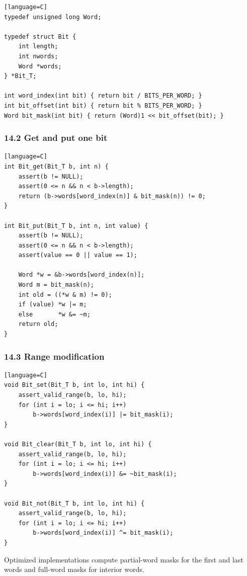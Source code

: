 \documentclass[11pt]{article}
\begin{document}
\begin{verbatim}[language=C]
typedef unsigned long Word;

typedef struct Bit {
    int length;
    int nwords;
    Word *words;
} *Bit_T;

int word_index(int bit) { return bit / BITS_PER_WORD; }
int bit_offset(int bit) { return bit % BITS_PER_WORD; }
Word bit_mask(int bit) { return (Word)1 << bit_offset(bit); }
\end{verbatim}

\subsubsection{14.2 Get and put one bit}\label{get-and-put-one-bit}

\begin{verbatim}[language=C]
int Bit_get(Bit_T b, int n) {
    assert(b != NULL);
    assert(0 <= n && n < b->length);
    return (b->words[word_index(n)] & bit_mask(n)) != 0;
}

int Bit_put(Bit_T b, int n, int value) {
    assert(b != NULL);
    assert(0 <= n && n < b->length);
    assert(value == 0 || value == 1);

    Word *w = &b->words[word_index(n)];
    Word m = bit_mask(n);
    int old = ((*w & m) != 0);
    if (value) *w |= m;
    else       *w &= ~m;
    return old;
}
\end{verbatim}

\subsubsection{14.3 Range modification}\label{range-modification}

\begin{verbatim}[language=C]
void Bit_set(Bit_T b, int lo, int hi) {
    assert_valid_range(b, lo, hi);
    for (int i = lo; i <= hi; i++)
        b->words[word_index(i)] |= bit_mask(i);
}

void Bit_clear(Bit_T b, int lo, int hi) {
    assert_valid_range(b, lo, hi);
    for (int i = lo; i <= hi; i++)
        b->words[word_index(i)] &= ~bit_mask(i);
}

void Bit_not(Bit_T b, int lo, int hi) {
    assert_valid_range(b, lo, hi);
    for (int i = lo; i <= hi; i++)
        b->words[word_index(i)] ^= bit_mask(i);
}
\end{verbatim}

Optimized implementations compute partial-word masks for the first and last words and full-word masks for interior words.
\end{document}
